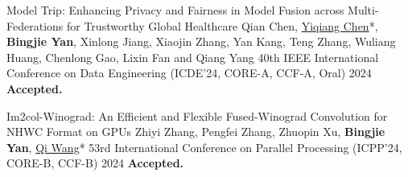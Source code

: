 \begin{cvpublications}

\cvpublication
{Model Trip: Enhancing Privacy and Fairness in Model Fusion across Multi-Federations for Trustworthy Global Healthcare} %
{Qian Chen, \underline{Yiqiang Chen}*, \textbf{Bingjie Yan}, Xinlong Jiang, Xiaojin Zhang, Yan Kang, Teng Zhang, Wuliang Huang, Chenlong Gao, Lixin Fan and Qiang Yang} %
{40th IEEE International Conference on Data Engineering (ICDE'24, CORE-A\ast, CCF-A, \textcolor{awesome}{Oral})} %
{2024} %
{\textbf{Accepted.}} %


\cvpublication
{Im2col-Winograd: An Efficient and Flexible Fused-Winograd Convolution for NHWC Format on GPUs} %
{Zhiyi Zhang, Pengfei Zhang, Zhuopin Xu, \textbf{Bingjie Yan}, \underline{Qi Wang}*} %
{53rd International Conference on Parallel Processing (ICPP'24, CORE-B, CCF-B)} %
{2024} %
{\textbf{Accepted.}} %

\end{cvpublications}

